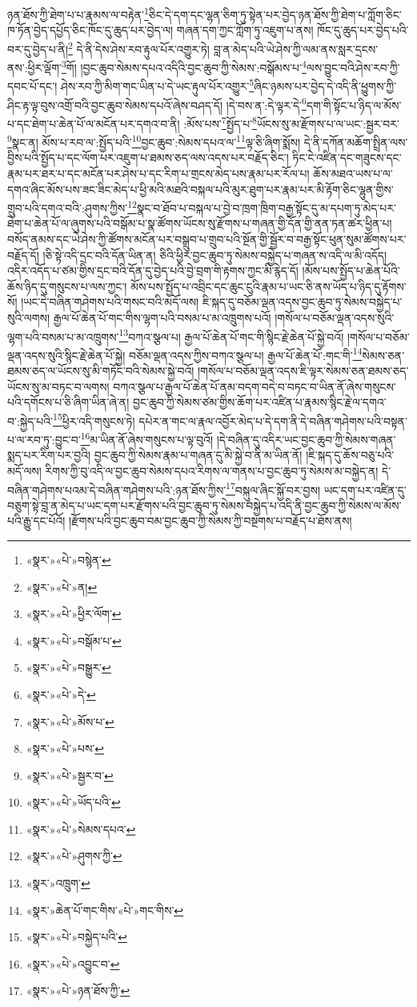 ཉན་ཐོས་ཀྱི་ཐེག་པ་པ་རྣམས་ལ་བརྟེན་\footnote{«སྣར་»«པེ་»བསྙེན་}ཅིང་དེ་དག་དང་ལྷན་ཅིག་ཏུ་སྟེན་པར་བྱེད་ཉན་ཐོས་ཀྱི་ཐེག་པ་ཀློག་ཅིང་ཁ་ཏོན་བྱེད་དཔྱོད་ཅིང་ཁོང་དུ་ཆུད་པར་བྱེད་ལ། གཞན་དག་ཀྱང་ཀློག་ཏུ་འཇུག་པ་ནས། ཁོང་དུ་ཆུད་པར་བྱེད་པའི་བར་དུ་བྱེད་པ་ནི།\footnote{«སྣར་»«པེ་»ན།} དེ་ནི་དེས་ཤེས་རབ་རྟུལ་པོར་འགྱུར་ཏེ། བླ་ན་མེད་པའི་ཡེ་ཤེས་ཀྱི་ལམ་ནས་སླར་དྲངས་ནས་:ཕྱིར་ལྡོག་\footnote{«སྣར་»«པེ་»ཕྱིར་ལོག་}གོ། །བྱང་ཆུབ་སེམས་དཔའ་འདིའི་བྱང་ཆུབ་ཀྱི་སེམས་:བསྒོམས་པ་\footnote{«སྣར་»«པེ་»བསྒོམ་པ་}ལས་བྱུང་བའི་ཤེས་རབ་ཀྱི་དབང་པོ་དང་། ཤེས་རབ་ཀྱི་མིག་གང་ཡིན་པ་དེ་ཡང་རྟུལ་པོར་འགྱུར་\footnote{«སྣར་»«པེ་»བསྒྱུར་}ཞིང་ཉམས་པར་བྱེད་དེ་འདི་ནི་ཕྱུགས་ཀྱི་ཤིང་རྟ་ལྟ་བུས་འགྲོ་བའི་བྱང་ཆུབ་སེམས་དཔའོ་ཞེས་བཤད་དོ། །དེ་བས་ན་:དེ་ལྟར་དེ་\footnote{«སྣར་»«པེ་»དེ་}དག་གི་སྟོང་པ་ཉིད་ལ་མོས་པ་དང་ཐེག་པ་ཆེན་པོ་ལ་མངོན་པར་དགའ་བ་ནི། :མོས་པས་\footnote{«སྣར་»«པེ་»མོས་པ་}སྤྱོད་པ་\footnote{«སྣར་»«པེ་»པས་}ཡོངས་སུ་མ་རྫོགས་པ་ལ་ཡང་:སྦྱར་བར་\footnote{«སྣར་»«པེ་»སྦྱར་བ་}སྣང་ན། མོས་པ་རབ་ལ་:སྤྱོད་པའི་\footnote{«སྣར་»«པེ་»ཡོད་པའི་}བྱང་ཆུབ་:སེམས་དཔའ་ལ་\footnote{«སྣར་»«པེ་»སེམས་དཔའ་}ལྟ་ཅི་ཞིག་སྨོས། དེ་ནི་དཀོན་མཆོག་སྤྲིན་ལས་བྱིས་པའི་སྤྱོད་པ་དང་ལོག་པར་འཇུག་པ་ཐམས་ཅད་ལས་འདས་པར་བརྗོད་ཅིང་། ཏིང་ངེ་འཛིན་དང་གཟུངས་དང་རྣམ་པར་ཐར་པ་དང་མངོན་པར་ཤེས་པ་དང་རིག་པ་གྲངས་མེད་པས་རྣམ་པར་རོལ་པ། ཆོས་མཐའ་ཡས་པ་ལ་དགའ་ཞིང་མོས་པས་ཟང་ཟིང་མེད་པ་ཕྱི་མའི་མཐའི་བསྐལ་པའི་མུར་ཐུག་པར་རྣམ་པར་མི་རྟོག་ཅིང་ལྷུན་གྱིས་གྲུབ་པའི་དགའ་བའི་:ཤུགས་ཀྱིས་\footnote{«སྣར་»«པེ་»ཤུགས་ཀྱི་}སྣང་བ་ཐོབ་པ་བསྐལ་པ་བྱེ་བ་ཁྲག་ཁྲིག་བརྒྱ་སྟོང་དུ་མ་དཔག་ཏུ་མེད་པར་ཐེག་པ་ཆེན་པོ་ལ་ཞུགས་པའི་བསྒོམ་པ་སྣ་ཚོགས་ཡོངས་སུ་རྫོགས་པ་གཞན་གྱི་དོན་གྱི་ནན་ཏན་ཚར་ཕྱིན་པ། བསོད་ནམས་དང་ཡེ་ཤེས་ཀྱི་ཚོགས་མངོན་པར་བསྒྲུབ་པ་གྲུབ་པའི་སྔོན་གྱི་སྦྱོར་བ་བརྒྱ་སྟོང་ཕུན་སུམ་ཚོགས་པར་བརྗོད་དོ། །ཅི་སྟེ་འདི་དྲང་བའི་དོན་ཡིན་ན། ཅིའི་ཕྱིར་བྱང་ཆུབ་ཏུ་སེམས་བསྐྱེད་པ་གཞན་ས་འདི་ལ་མི་འདོད། འདིར་འདོད་པ་ཙམ་གྱིས་དྲང་བའི་དོན་དུ་བྱེད་པའི་བྱེ་བྲག་གི་རྟགས་ཀྱང་མི་རྙེད་དོ། །མོས་པས་སྤྱོད་པ་ཆེན་པོའི་ཆོས་ཉིད་དུ་གསུངས་པ་ལས་ཀྱང་། མོས་པས་སྤྱོད་པ་འབྲིང་དང་ཆུང་ངུའི་རྣམ་པ་ཡང་ཅི་ནས་ཡོད་པ་ཉིད་དུ་རྟོགས་སོ། །ཡང་དེ་བཞིན་གཤེགས་པའི་གསང་བའི་མདོ་ལས། ཇི་སྐད་དུ་བཅོམ་ལྡན་འདས་བྱང་ཆུབ་ཏུ་སེམས་བསྐྱེད་པ་སུའི་ལགས། རྒྱལ་པོ་ཆེན་པོ་གང་གིས་ལྷག་པའི་བསམ་པ་མ་འཁྲུགས་པའོ། །གསོལ་པ་བཅོམ་ལྡན་འདས་སུའི་ལྷག་པའི་བསམ་པ་མ་འཁྲུགས་\footnote{«སྣར་»འཁྲུག་}བཀའ་སྩལ་པ། རྒྱལ་པོ་ཆེན་པོ་གང་གི་སྙིང་རྗེ་ཆེན་པོ་སྐྱེ་བའོ། །གསོལ་པ་བཅོམ་ལྡན་འདས་སུའི་སྙིང་རྗེ་ཆེན་པོ་སྐྱེ། བཅོམ་ལྡན་འདས་ཀྱིས་བཀའ་སྩལ་པ། རྒྱལ་པོ་ཆེན་པོ་:གང་གི་\footnote{«སྣར་»ཆེན་པོ་གང་གིས་«པེ་»གང་གིས་}སེམས་ཅན་ཐམས་ཅད་ལ་ཡོངས་སུ་མི་གཏོང་བའི་སེམས་སྐྱེ་བའོ། །གསོལ་པ་བཅོམ་ལྡན་འདས་ཇི་ལྟར་སེམས་ཅན་ཐམས་ཅད་ཡོངས་སུ་མ་བཏང་བ་ལགས། བཀའ་སྩལ་པ་རྒྱལ་པོ་ཆེན་པོ་ནམ་བདག་བདེ་བ་བཏང་བ་ཡིན་ནོ་ཞེས་གསུངས་པའི་དགོངས་པ་ཅི་ཞིག་ཡིན་ཞེ་ན། བྱང་ཆུབ་ཀྱི་སེམས་ཙམ་གྱིས་ཆོག་པར་འཛིན་པ་རྣམས་སྙིང་རྗེ་ལ་དགའ་བ་:སྐྱེད་པའི་\footnote{«སྣར་»«པེ་»བསྐྱེད་པའི་}ཕྱིར་འདི་གསུངས་ཏེ། དཔེར་ན་གང་ལ་རྣལ་འབྱོར་མེད་པ་དེ་དག་ནི་དེ་བཞིན་གཤེགས་པའི་བསྟན་པ་ལ་རབ་ཏུ་:བྱུང་བ་\footnote{«སྣར་»«པེ་»འབྱུང་བ་}མ་ཡིན་ནོ་ཞེས་གསུངས་པ་ལྟ་བུའོ། །དེ་བཞིན་དུ་འདིར་ཡང་བྱང་ཆུབ་ཀྱི་སེམས་གཞན་སྨད་པར་རིག་པར་བྱའི། བྱང་ཆུབ་ཀྱི་སེམས་རྣམ་པ་གཞན་དུ་མི་སྐྱེ་བ་ནི་མ་ཡིན་ནོ། །ཇི་སྐད་དུ་ཆོས་བཅུ་པའི་མདོ་ལས། རིགས་ཀྱི་བུ་འདི་ལ་བྱང་ཆུབ་སེམས་དཔའ་རིགས་ལ་གནས་པ་བྱང་ཆུབ་ཏུ་སེམས་མ་བསྐྱེད་ན། དེ་བཞིན་གཤེགས་པའམ་དེ་བཞིན་གཤེགས་པའི་:ཉན་ཐོས་ཀྱིས་\footnote{«སྣར་»«པེ་»ཉན་ཐོས་ཀྱི་}བསྐུལ་ཞིང་སྐྱོ་བར་བྱས། ཡང་དག་པར་འཛིན་དུ་བཅུག་སྟེ་བླ་ན་མེད་པ་ཡང་དག་པར་རྫོགས་པའི་བྱང་ཆུབ་ཏུ་སེམས་བསྐྱེད་པ་འདི་ནི་བྱང་ཆུབ་ཀྱི་སེམས་ལ་མོས་པའི་རྒྱུ་དང་པོའོ། །རྫོགས་པའི་བྱང་ཆུབ་བམ་བྱང་ཆུབ་ཀྱི་སེམས་ཀྱི་བསྔགས་པ་བརྗོད་པ་ཐོས་ནས། 